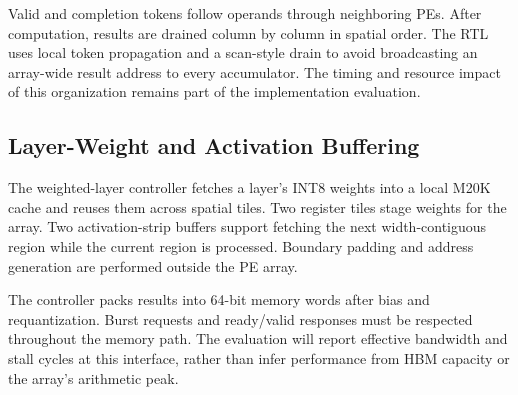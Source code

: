 Valid and completion tokens follow operands through neighboring PEs.
After computation, results are drained column by column in spatial
order. The RTL uses local token propagation and a scan-style drain to avoid
broadcasting an array-wide result address to every accumulator. The timing
and resource impact of this organization remains part of the implementation
evaluation.

\subsection{Layer-Weight and Activation Buffering}
The weighted-layer controller fetches a layer's INT8 weights into a local
M20K cache and reuses them across spatial tiles. Two register tiles stage
weights for the array. Two activation-strip buffers support fetching the next
width-contiguous region while the current region is processed. Boundary
padding and address generation are performed outside the PE array.

The controller packs results into 64-bit memory words after bias and
requantization. Burst requests and ready/valid responses must be respected
throughout the memory path. The evaluation will report effective bandwidth
and stall cycles at this interface, rather than infer performance from HBM
capacity or the array's arithmetic peak.
